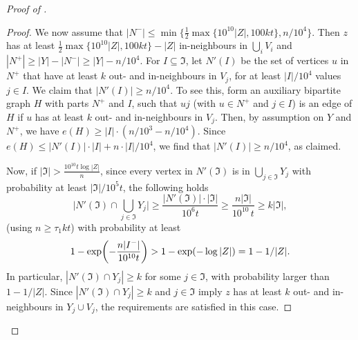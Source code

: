 \documentclass[english]{article}
\theoremstyle{plain}
\theoremstyle{remark}
\def \Np {N^+}
\def \Nm {N^-}
\def \Np {N^+}
\def \Nm {N^-}
\let\originalleft\left
\let\originalright\right
\renewcommand{\left}{\mathopen{}\mathclose\bgroup\originalleft}
\renewcommand{\right}{\aftergroup\egroup\originalright}
\begin{document}
\begin{proof}[Proof of ]
\begin{proof}
			We now assume that $|\Nm| \le \min\{\frac{1}{2}\max\{10^{10}|Z|, 100kt\}, n/10^4\}$. Then $z$ has at least $\frac{1}{2}\max\{10^{10}|Z|, 100kt\} - |Z|$ in-neighbours in $\bigcup_i V_i$ and $|\Np| \ge |Y| - |\Nm| \ge |Y| - n/10^4$.
For $I \subseteq \Im$, let $N'(I)$ be the set of vertices $u$ in $\Np$ that have at least $k$ out- and in-neighbours in $V_j$, for at least $|I| / 10^4$ values $j \in I$.
			We claim that $|N'(I)| \ge n / 10^4$. To see this, form an auxiliary bipartite graph $H$ with parts $\Np$ and $I$, such that $uj$ (with $u \in \Np$ and $j \in I$) is an edge of $H$ if $u$ has at least $k$ out- and in-neighbours in $V_j$. Then, by assumption on $Y$ and $\Np$, we have $e(H) \ge |I| \cdot (n / 10^3 - n / 10^4)$. Since $e(H) \le |N'(I)| \cdot |I| + n \cdot |I| / 10^4$, we find that $|N'(I)| \ge n / 10^4$, as claimed.

			Now, if $|\Im| > \frac{10^{10}t \log |Z|}{n}$, since every vertex in $N'(\Im)$ is in $\bigcup_{j \in \Im} Y_j$ with probability at least $|\Im| / 10^5 t$, the following holds
			\begin{equation*}
				\Big|N'(\Im) \cap \bigcup_{j \in \Im} Y_j\Big| 
				\ge \frac{|N'(\Im)| \cdot |\Im|}{10^6 t}
				\ge \frac{n |\Im|}{10^{10} \, t}
				\ge k|\Im|,
			\end{equation*}
			(using $n \ge \tau_1 kt$) with probability at least 
			\begin{equation*}
				1 - \exp\left(-\frac{n|\Im|}{10^{10} t}\right) > 1 - \exp(-\log |Z|) = 1 - 1/|Z|.
			\end{equation*}
			In particular, $|N'(\Im) \cap Y_j| \ge k$ for some $j \in \Im$, with probability larger than $1 - 1/|Z|$. Since $|N'(\Im) \cap Y_j| \ge k$ and $j \in \Im$ imply $z$ has at least $k$ out- and in-neighbours in $Y_j \cup V_j$, the requirements are satisfied in this case.


\end{proof}
\end{proof}
\end{document}
